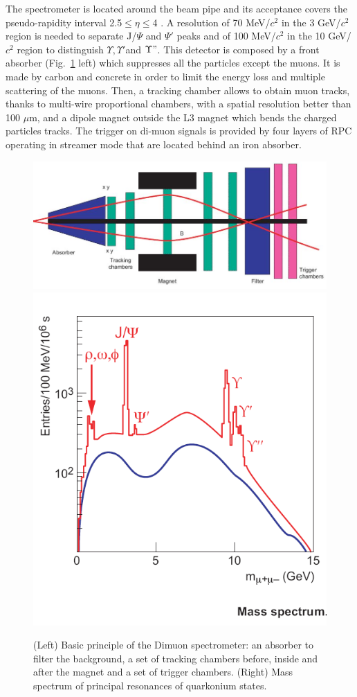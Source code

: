 The spectrometer is located around the beam pipe and its acceptance covers
 the pseudo-rapidity interval 2.5$\leq \eta \leq$4 \cite{FMS-TDR}. A resolution 
 of 70 MeV/$c^2$ in the 3 GeV/$c^2$ region is needed to separate J/$\Psi$ and 
 $\Psi'$ peaks and of 100 MeV/$c^2$ in the 10 GeV/$c^2$ region to distinguish $\Upsilon, \Upsilon' $and $\Upsilon"$.
This detector is composed by a front absorber (Fig.~\ref{fig:muon} left) which 
suppresses all the particles except the muons. It is made by carbon and concrete
 in order to limit the energy loss and multiple scattering of the muons. Then, a tracking 
 chamber allows to obtain muon tracks, thanks to multi-wire proportional chambers, 
 with a spatial resolution better than 100 $\mu$m, and a dipole magnet outside the L3
  magnet which bends the charged particles tracks. The trigger on di-muon signals is 
  provided by four layers of RPC operating in streamer mode that are located behind an iron absorber.
\begin{figure}[!t]
\centering
\includegraphics[width=.49\textwidth]{FigCap3/dimuon1.jpeg}
\includegraphics[width=.49\textwidth]{FigCap3/dimuon2.png}
\caption{(Left) Basic principle of the Dimuon spectrometer: an absorber to filter the background, a set of tracking chambers before, inside and after the magnet and a set of trigger chambers. (Right) Mass spectrum of principal resonances of quarkonium states.}
\label{fig:muon}
\end{figure}
\fi

